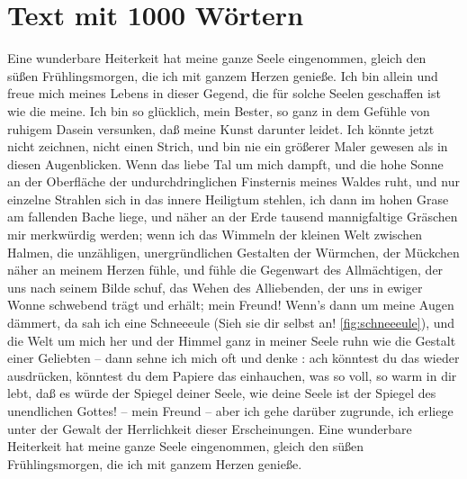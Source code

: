 \documentclass{scrreprt}
\begin{document}
		\section{Text mit 1000 Wörtern \cite{ref1}} 
		Eine wunderbare Heiterkeit hat meine ganze Seele eingenommen, gleich den süßen Frühlingsmorgen, die ich mit ganzem Herzen genieße. Ich bin allein und freue mich meines Lebens in dieser Gegend, die für solche Seelen geschaffen ist wie die meine. Ich bin so glücklich, mein Bester, so ganz in dem Gefühle von ruhigem Dasein versunken, daß meine Kunst darunter leidet.
		 Ich könnte jetzt nicht zeichnen, nicht einen Strich, und bin nie ein größerer Maler gewesen als in diesen Augenblicken. Wenn das liebe Tal um mich dampft, und die hohe Sonne an der Oberfläche der undurchdringlichen Finsternis meines Waldes ruht, und nur einzelne Strahlen sich in das innere Heiligtum stehlen, ich dann im hohen Grase am fallenden Bache liege, und näher an der Erde tausend mannigfaltige Gräschen mir merkwürdig werden; wenn ich das Wimmeln der kleinen Welt zwischen Halmen, die unzähligen, unergründlichen Gestalten der Würmchen, der Mückchen näher an meinem Herzen fühle, und fühle die Gegenwart des Allmächtigen, der uns nach seinem Bilde schuf, das Wehen des Alliebenden, der uns in ewiger Wonne schwebend trägt und erhält; mein Freund! Wenn’s dann um meine Augen dämmert, da sah ich eine Schneeeule (Sieh sie dir selbst an! \ref{fig:schneeeule}), und die Welt um mich her und der Himmel ganz in meiner Seele ruhn wie die Gestalt einer Geliebten – dann sehne ich mich oft und denke : ach könntest du das wieder ausdrücken, könntest du dem Papiere das einhauchen, was so voll, so warm in dir lebt, daß es würde der Spiegel deiner Seele, wie deine Seele ist der Spiegel des unendlichen Gottes! – mein Freund – aber ich gehe darüber zugrunde, ich erliege unter der Gewalt der Herrlichkeit dieser Erscheinungen. Eine wunderbare Heiterkeit hat meine ganze Seele eingenommen, gleich den süßen Frühlingsmorgen, die ich mit ganzem Herzen genieße.\\
		
\end{document}

